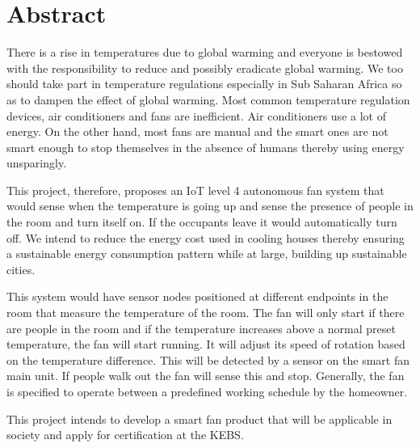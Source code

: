 
\section*{Abstract}
\label{sec:Abstract}

There is a rise in temperatures due to global warming and everyone is bestowed with the responsibility to reduce and possibly eradicate global warming. We too should take part in temperature regulations especially in Sub Saharan Africa so as to dampen the effect of global warming. Most common temperature regulation devices, air conditioners and fans are inefficient. Air conditioners use a lot of energy. On the other hand, most fans are manual and the smart ones are not smart enough to stop themselves in the absence of humans thereby using energy unsparingly.
\par
This project, therefore, proposes an \ac{IoT} level 4 autonomous fan system that would sense when the temperature is going up and sense the presence of people in the room and turn itself on. If the occupants leave it would automatically turn off. We intend to reduce the energy cost used in cooling houses thereby ensuring a sustainable energy consumption pattern while at large, building up sustainable cities.
\par
This system would have sensor nodes positioned at different endpoints in the room that measure the temperature of the room. The fan will only start if there are people in the room and if the temperature increases above a normal preset temperature, the fan will start running. It will adjust its speed of rotation based on the temperature difference. This will be detected by a sensor on the smart fan main unit. If people walk out the fan will sense this and stop. Generally, the fan is specified to operate between a predefined working schedule by the homeowner.
\par
This project intends to develop a smart fan product that will be applicable in society and apply for certification at the \ac{KEBS}.
